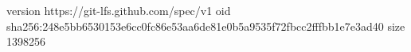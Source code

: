 version https://git-lfs.github.com/spec/v1
oid sha256:248e5bb6530153e6cc0fc86e53aa6de81e0b5a9535f72fbcc2fffbb1e7e3ad40
size 1398256
